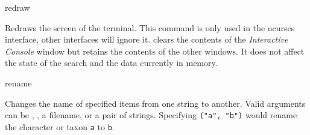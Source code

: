 \begin{command}{redraw}{}

	\syntax{\obligatory{()}}

	\begin{poydescription}
        Redraws the screen of the terminal. This command is only used in the ncurses
        interface, other interfaces will ignore it.  clears the
        contents of the \emph{Interactive Console} window but retains the contents
        of the other windows. It does not affect the state of the search and the data
        currently in memory.
	\end{poydescription}

    \begin{poyexamples}
    \end{poyexamples}

\end{command}

\begin{command}{rename}{}

	\syntax{\obligatory{(argument)}}

	\begin{poydescription} 
        Changes the name of specified items from one string to another. Valid
         arguments can be ,
        , a filename, or a pair of strings. Specifying \texttt{("a",
        "b")} would rename the character or taxon \texttt{a} to \texttt{b}.
	\end{poydescription}

\end{command}
        

